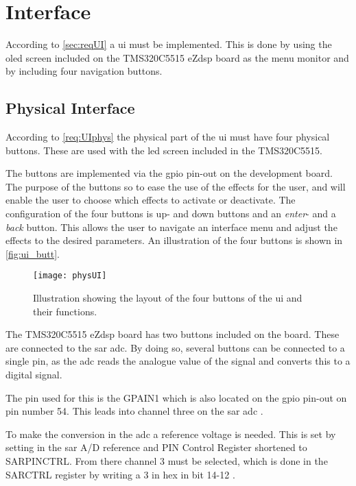 \section{Interface}\label{sec:ui_design}
According to \autoref{sec:reqUI} a \gls{ui} must be implemented. This is done by using the \gls{oled} screen included on the TMS320C5515 eZdsp board as the menu monitor and by including four navigation buttons.

\subsection{Physical Interface}\label{sec:physUI}
According to \autoref{req:UIphys} the physical part of the \gls{ui} must have four physical buttons. These are used with the \gls{led} screen included in the TMS320C5515.

The buttons are implemented via the \gls{gpio} pin-out on the development board. The purpose of the buttons so to ease the use of the effects for the user, and will enable the user to choose which effects to activate or deactivate. The configuration of the four buttons is up- and down buttons and an \textit{enter}- and a \textit{back} button. This allows the user to navigate an interface menu and adjust the effects to the desired parameters. An illustration of the four buttons is shown in \autoref{fig:ui_butt}.

\begin{figure}[htbp]
	\centering
	\texttt{[image: physUI]}
	\caption{Illustration showing the layout of the four buttons of the \gls{ui} and their functions.}
	\label{fig:ui_butt}
\end{figure}

The TMS320C5515 eZdsp board has two buttons included on the board. These are connected to the \gls{sar} \gls{adc}. By doing so, several buttons can be connected to a single pin, as the \gls{adc} reads the analogue value of the signal and converts this to a digital signal.

The pin used for this is the GPAIN1 which is also located on the \gls{gpio} pin-out on pin number 54. This leads into channel three on the \gls{sar} \gls{adc} \citep{dsp_sar}.

To make the conversion in the \gls{adc} a reference voltage is needed. This is set by setting in the \gls{sar} A/D reference and PIN Control Register shortened to SARPINCTRL. From there channel 3 must be selected, which is done in the SARCTRL register by writing a 3 in hex in bit 14-12 \citep{dsp_sar}. 

